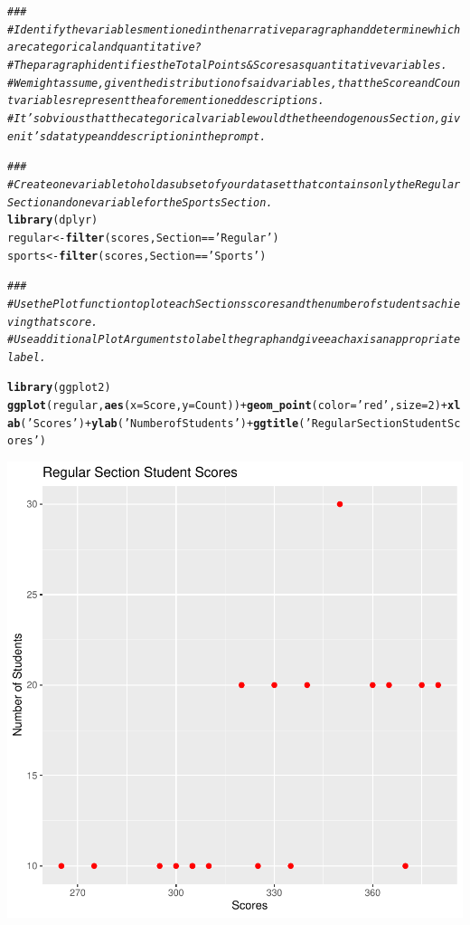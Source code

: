 \documentclass{article}\usepackage[]{graphicx}\usepackage[]{xcolor}
\makeatletter
\newcommand{\hlnum}[1]{\textcolor[rgb]{0.686,0.059,0.569}{#1}}%
\newcommand{\hlstr}[1]{\textcolor[rgb]{0.192,0.494,0.8}{#1}}%
\newcommand{\hlcom}[1]{\textcolor[rgb]{0.678,0.584,0.686}{\textit{#1}}}%
\newcommand{\hlopt}[1]{\textcolor[rgb]{0,0,0}{#1}}%
\newcommand{\hlstd}[1]{\textcolor[rgb]{0.345,0.345,0.345}{#1}}%
\newcommand{\hlkwb}[1]{\textcolor[rgb]{0.69,0.353,0.396}{#1}}%
\newcommand{\hlkwc}[1]{\textcolor[rgb]{0.333,0.667,0.333}{#1}}%
\newcommand{\hlkwd}[1]{\textcolor[rgb]{0.737,0.353,0.396}{\textbf{#1}}}%
\newenvironment{kframe}{%
 \def\at@end@of@kframe{}%
 \ifinner\ifhmode%
  \def\at@end@of@kframe{\end{minipage}}%
  \begin{minipage}{\columnwidth}%
 \fi\fi%
 \def\FrameCommand##1{\hskip\@totalleftmargin \hskip-\fboxsep
 \colorbox{shadecolor}{##1}\hskip-\fboxsep
     \hskip-\linewidth \hskip-\@totalleftmargin \hskip\columnwidth}%
 \MakeFramed {\advance\hsize-\width
   \@totalleftmargin\z@ \linewidth\hsize
   \@setminipage}}%
 {\par\unskip\endMakeFramed%
 \at@end@of@kframe}
\newenvironment{knitrout}{}{} %
\makeatother
\begin{document}
\begin{knitrout}
\begin{kframe}
\begin{alltt}
\hlcom{###}
\hlcom{# Identify the variables mentioned in the narrative paragraph and determine which are categorical and quantitative?}
  \hlcom{# The paragraph identifies the Total Points & Scores as quantitative variables.}
  \hlcom{# We might assume, given the distribution of said variables, that the Score and Count variables represent the aforementioned descriptions.}
  \hlcom{# It's obvious that the categorical variable would the the endogenous Section, given it's datatype and description in the prompt.}

\hlcom{###}
\hlcom{# Create one variable to hold a subset of your data set that contains only the Regular Section and one variable for the Sports Section.}
\hlkwd{library}\hlstd{(dplyr)}
\hlstd{regular} \hlkwb{<-} \hlkwd{filter}\hlstd{(scores, Section} \hlopt{==} \hlstr{'Regular'}\hlstd{)}
\hlstd{sports} \hlkwb{<-}  \hlkwd{filter}\hlstd{(scores, Section} \hlopt{==} \hlstr{'Sports'}\hlstd{)}

\hlcom{###}
\hlcom{# Use the Plot function to plot each Sections scores and the number of students achieving that score.}
\hlcom{# Use additional Plot Arguments to label the graph and give each axis an appropriate label.}

\hlkwd{library}\hlstd{(ggplot2)}
\hlkwd{ggplot}\hlstd{(regular,} \hlkwd{aes}\hlstd{(}\hlkwc{x}\hlstd{=Score,} \hlkwc{y}\hlstd{=Count))} \hlopt{+} \hlkwd{geom_point}\hlstd{(}\hlkwc{color} \hlstd{=} \hlstr{'red'}\hlstd{,} \hlkwc{size} \hlstd{=} \hlnum{2}\hlstd{)} \hlopt{+} \hlkwd{xlab}\hlstd{(}\hlstr{'Scores'}\hlstd{)} \hlopt{+} \hlkwd{ylab}\hlstd{(}\hlstr{'Number of Students'}\hlstd{)} \hlopt{+} \hlkwd{ggtitle}\hlstd{(}\hlstr{'Regular Section Student Scores'}\hlstd{)}
\end{alltt}
\end{kframe}

{\centering \includegraphics[width=.6\linewidth]{figure/assignment-4-1-SyversonLuke-Rnwauto-report-1} 

}
\end{knitrout}
\end{document}
